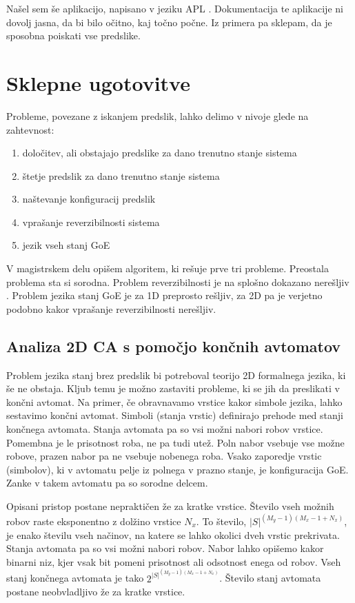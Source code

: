 \documentclass[12pt,a4paper,openany,twoside]{book}
\begin{document}
Našel sem še aplikacijo, napisano v jeziku APL \cite{ionreq2013}.
Dokumentacija te aplikacije ni dovolj jasna, da bi bilo očitno, kaj točno počne.
Iz primera pa sklepam, da je sposobna poiskati vse predslike.

\chapter{Sklepne ugotovitve}

Probleme, povezane z iskanjem predslik, lahko delimo v nivoje glede na zahtevnost:
\begin{enumerate}
\item določitev, ali obstajajo predslike za dano trenutno stanje sistema
\item štetje predslik za dano trenutno stanje sistema
\item naštevanje konfiguracij predslik
\item vprašanje reverzibilnosti sistema
\item jezik vseh stanj GoE
\end{enumerate}

V magistrskem delu opišem algoritem, ki rešuje prve tri probleme.
Preostala problema sta si sorodna.
Problem reverzibilnosti je na splošno dokazano nerešljiv \cite{Kari1989}.
Problem jezika stanj GoE je za 1D preprosto rešljiv, za 2D pa je
verjetno podobno kakor vprašanje reverzibilnosti nerešljiv.

\section{Analiza 2D CA s pomočjo končnih avtomatov}

Problem jezika stanj brez predslik bi potreboval teorijo 2D formalnega jezika, ki še ne obstaja.
Kljub temu je možno zastaviti probleme, ki se jih da preslikati v končni avtomat.
Na primer, če obravnavamo vrstice kakor simbole jezika, lahko sestavimo končni avtomat.
Simboli (stanja vrstic) definirajo prehode med stanji končnega avtomata. Stanja avtomata pa
so vsi možni nabori robov vrstice. Pomembna je le prisotnost roba, ne pa tudi utež.
Poln nabor vsebuje vse možne robove, prazen nabor pa ne vsebuje nobenega roba.
Vsako zaporedje vrstic (simbolov), ki v avtomatu pelje iz polnega v prazno stanje, je konfiguracija GoE.
Zanke v takem avtomatu pa so sorodne delcem.

Opisani pristop postane nepraktičen že za kratke vrstice.
Število vseh možnih robov raste eksponentno z dolžino vrstice \(N_x\).
To število, \(|S|^{(M_y-1)(M_x-1+N_x)}\), je enako številu vseh načinov,
na katere se lahko okolici dveh vrstic prekrivata.
Stanja avtomata pa so vsi možni nabori robov.
Nabor lahko opišemo kakor binarni niz, kjer vsak bit pomeni
prisotnost ali odsotnost enega od robov.
Vseh stanj končnega avtomata je tako \(2^{ |S|^{(M_y-1)(M_x-1+N_x)} }\).
Število stanj avtomata postane neobvladljivo že za kratke vrstice.
\end{document}
